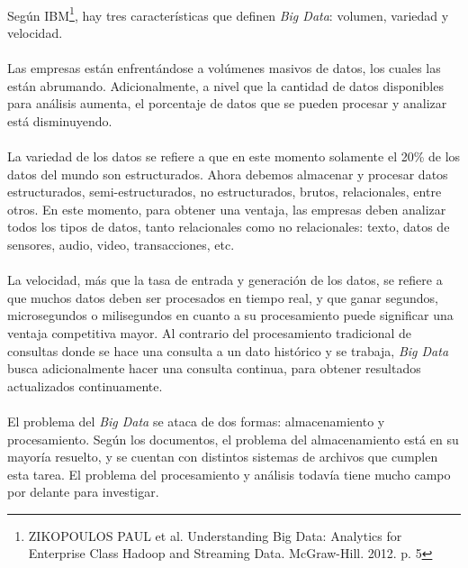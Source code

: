 \paragraph{}
Seg\'un IBM\footnote{ZIKOPOULOS PAUL et al. Understanding Big Data: Analytics for Enterprise Class Hadoop and Streaming Data. McGraw-Hill. 2012. p. 5}, hay tres caracter\'isticas que definen \textit{Big Data}: volumen, variedad y velocidad. 
\paragraph{}
Las empresas est\'an enfrent\'andose a vol\'umenes masivos de datos, los cuales las est\'an abrumando. Adicionalmente, a nivel que la cantidad de datos disponibles para an\'alisis aumenta, el porcentaje de datos que se pueden procesar y analizar est\'a disminuyendo.
\paragraph{}
La variedad de los datos se refiere a que en este momento solamente el 20\% de los datos del mundo son estructurados. Ahora debemos almacenar y procesar datos estructurados, semi-estructurados, no estructurados, brutos, relacionales, entre otros. En este momento, para obtener una ventaja, las empresas deben analizar todos los tipos de datos, tanto relacionales como no relacionales: texto, datos de sensores, audio, video, transacciones, etc.
\paragraph{}
La velocidad, m\'as que la tasa de entrada y generaci\'on de los datos, se refiere a que muchos datos deben ser procesados en tiempo real, y que ganar segundos, microsegundos o milisegundos en cuanto a su procesamiento puede significar una ventaja competitiva mayor. Al contrario del procesamiento tradicional de consultas donde se hace una consulta a un dato hist\'orico y se trabaja, \textit{Big Data} busca adicionalmente hacer una consulta continua, para obtener resultados actualizados continuamente.
\paragraph{}
El problema del \textit{Big Data} se ataca de dos formas: almacenamiento y procesamiento. Seg\'un los documentos, el problema del almacenamiento est\'a en su mayor\'ia resuelto, y se cuentan con distintos sistemas de archivos que cumplen esta tarea. El problema del procesamiento y an\'alisis todav\'ia tiene mucho campo por delante para investigar.
